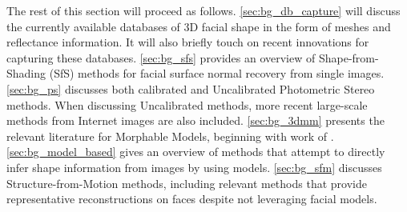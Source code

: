 The rest of this section will proceed as follows. \cref{sec:bg_db_capture} will
discuss the currently available databases of 3D facial shape in the form
of meshes and reflectance information. It will also briefly touch on recent
innovations for capturing these databases. \cref{sec:bg_sfs} provides an overview
of Shape-from-Shading (SfS) methods for facial surface normal recovery from
single images. \cref{sec:bg_ps} discusses both calibrated and
Uncalibrated Photometric Stereo methods. When discussing Uncalibrated methods,
more recent large-scale methods from Internet images are also included.
\cref{sec:bg_3dmm} presents the relevant literature for Morphable Models,
beginning with work of \citet{volker1999morphable}.
\cref{sec:bg_model_based} gives an
overview of methods that attempt to directly infer shape information from images
by using models. \cref{sec:bg_sfm} discusses Structure-from-Motion methods,
including relevant methods that provide representative reconstructions
on faces despite not leveraging facial models.







\stopcontents[chapters]
